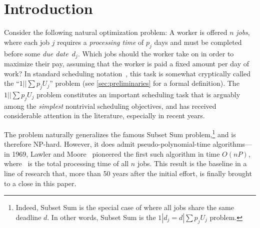 \documentclass[10pt,a4paper]{article}
\newcommand\Order{O}
\newcommand\MTPT{\smash{$1||\sum p_j U_j$}}
\begin{document}


\section{Introduction}
\label{sec:introduction}
Consider the following natural optimization problem: A worker is offered $n$ \emph{jobs}, where each job $j$ requires a \emph{processing time} of $p_j$ days and must be completed before some \emph{due date~$d_j$}. Which jobs should the worker take on in order to maximize their pay, assuming that the worker is paid a fixed amount per day of work? In standard scheduling notation~\cite{GrahamLLK79}, this task is somewhat cryptically called the ``$1||\sum p_j U_j$'' problem (see \cref{sec:preliminaries} for a formal definition). The $1||\sum p_j U_j$ problem constitutes an important scheduling task that is arguably among the \emph{simplest} nontrivial scheduling objectives, and has received considerable attention in the literature, especially in recent years.

The \MTPT{} problem naturally generalizes the famous Subset Sum problem,\footnote{Indeed, Subset Sum is the special case of \MTPT{} where all jobs share the same deadline $d$. In other words, Subset Sum is the $1|d_j = d|\sum p_j U_j$ problem.} and is therefore NP-hard. However, it does admit pseudo-polynomial-time algorithms---in 1969, Lawler and Moore~\cite{LawlerM69} pioneered the first such algorithm in time $\Order(n P)$, where~ is the total processing time of all $n$ jobs. This result is the baseline in a line of research that, more than 50 years after the initial effort, is finally brought to a close in this paper.
\end{document}
